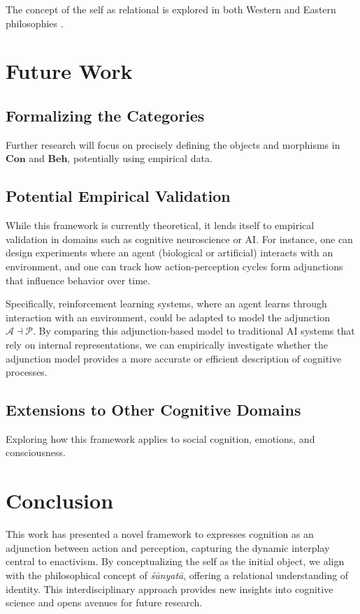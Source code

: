 \documentclass{article}
\begin{document}
The concept of the self as relational is explored in both Western \cite{heidegger1962} and Eastern philosophies \cite{garfield1995}.

\section{Future Work}

\subsection{Formalizing the Categories}

Further research will focus on precisely defining the objects and morphisms in $\mathbf{Con}$ and $\mathbf{Beh}$, potentially using empirical data.

\subsection{Potential Empirical Validation}
While this framework is currently theoretical, it lends itself to empirical validation in domains such as cognitive neuroscience or AI. For instance, one can design experiments where an agent (biological or artificial) interacts with an environment, and one can track how action-perception cycles form adjunctions that influence behavior over time.

Specifically, reinforcement learning systems, where an agent learns through interaction with an environment, could be adapted to model the adjunction $\mathcal{A} \dashv \mathcal{P}$. By comparing this adjunction-based model to traditional AI systems that rely on internal representations, we can empirically investigate whether the adjunction model provides a more accurate or efficient description of cognitive processes.

\subsection{Extensions to Other Cognitive Domains}

Exploring how this framework applies to social cognition, emotions, and consciousness.

\section{Conclusion}

This work has presented a novel framework to expresses cognition as an adjunction between action and perception, capturing the dynamic interplay central to enactivism. By conceptualizing the self as the initial object, we align with the philosophical concept of \emph{śūnyatā}, offering a relational understanding of identity. This interdisciplinary approach provides new insights into cognitive science and opens avenues for future research.
\end{document}
